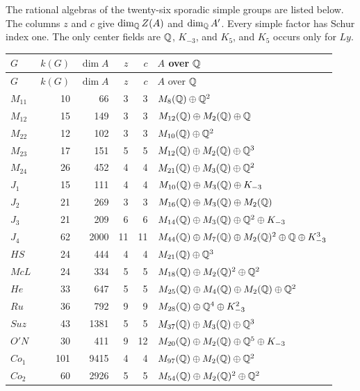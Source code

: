\begin{theorem}
\label{thm:sporadic-census}
The rational algebras of the twenty-six sporadic simple
groups are listed below.  The columns $z$ and $c$ give $\dim_{\mathbb Q}Z(A)$ and
$\dim_{\mathbb Q}A'$.  Every simple factor has Schur index one.  The only center
fields are $\mathbb Q$, $K_{-3}$, and $K_5$, and $K_5$ occurs only for $Ly$.

\begingroup
\footnotesize
\normalfont
\setlength{\tabcolsep}{3pt}
\renewcommand{\arraystretch}{1.08}
\begin{longtable}{@{}lrrrrp{}@{}}
\toprule
$G$ & $k(G)$ & $\dim A$ & $z$ & $c$ & $A$ over $\mathbb Q$\\
\midrule
\endfirsthead
\toprule
$G$ & $k(G)$ & $\dim A$ & $z$ & $c$ & $A$ over $\mathbb Q$\\
\midrule
\endhead
$M_{11}$ & 10 & 66 & 3 & 3 & $M_8(\mathbb Q)\oplus\mathbb Q^2$\\
$M_{12}$ & 15 & 149 & 3 & 3 & $M_{12}(\mathbb Q)\oplus M_2(\mathbb Q)\oplus\mathbb Q$\\
$M_{22}$ & 12 & 102 & 3 & 3 & $M_{10}(\mathbb Q)\oplus\mathbb Q^2$\\
$M_{23}$ & 17 & 151 & 5 & 5 & $M_{12}(\mathbb Q)\oplus M_2(\mathbb Q)\oplus\mathbb Q^3$\\
$M_{24}$ & 26 & 452 & 4 & 4 & $M_{21}(\mathbb Q)\oplus M_3(\mathbb Q)\oplus\mathbb Q^2$\\
$J_1$ & 15 & 111 & 4 & 4 & $M_{10}(\mathbb Q)\oplus M_3(\mathbb Q)\oplus K_{-3}$\\
$J_2$ & 21 & 269 & 3 & 3 & $M_{16}(\mathbb Q)\oplus M_3(\mathbb Q)\oplus M_2(\mathbb Q)$\\
$J_3$ & 21 & 209 & 6 & 6 & $M_{14}(\mathbb Q)\oplus M_3(\mathbb Q)\oplus\mathbb Q^2\oplus K_{-3}$\\
$J_4$ & 62 & 2000 & 11 & 11 &
$M_{44}(\mathbb Q)\oplus M_7(\mathbb Q)\oplus M_2(\mathbb Q)^2\oplus\mathbb Q\oplus K_{-3}^3$\\
$HS$ & 24 & 444 & 4 & 4 & $M_{21}(\mathbb Q)\oplus\mathbb Q^3$\\
$McL$ & 24 & 334 & 5 & 5 & $M_{18}(\mathbb Q)\oplus M_2(\mathbb Q)^2\oplus\mathbb Q^2$\\
$He$ & 33 & 647 & 5 & 5 & $M_{25}(\mathbb Q)\oplus M_4(\mathbb Q)\oplus M_2(\mathbb Q)\oplus\mathbb Q^2$\\
$Ru$ & 36 & 792 & 9 & 9 & $M_{28}(\mathbb Q)\oplus\mathbb Q^4\oplus K_{-3}^2$\\
$Suz$ & 43 & 1381 & 5 & 5 & $M_{37}(\mathbb Q)\oplus M_3(\mathbb Q)\oplus\mathbb Q^3$\\
$O'N$ & 30 & 411 & 9 & 12 & $M_{20}(\mathbb Q)\oplus M_2(\mathbb Q)\oplus\mathbb Q^5\oplus K_{-3}$\\
$Co_1$ & 101 & 9415 & 4 & 4 & $M_{97}(\mathbb Q)\oplus M_2(\mathbb Q)\oplus\mathbb Q^2$\\
$Co_2$ & 60 & 2926 & 5 & 5 & $M_{54}(\mathbb Q)\oplus M_2(\mathbb Q)^2\oplus\mathbb Q^2$\\

\end{longtable}
\end{theorem}
